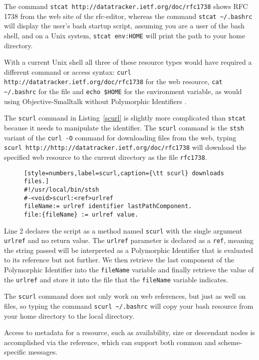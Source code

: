 \documentclass[preprint,authoryear]{llncs}
\begin{document}
The command  {\tt stcat http://datatracker.ietf.org/doc/rfc1738} shows RFC 1738 from the web site of the rfc-editor, whereas 
the command {\tt stcat \~\//.bashrc} will display the user's bash startup script, assuming you are a user of the
bash shell, and on a Unix system, {\tt stcat env:HOME} will print the path to 
your home directory.

With a current Unix shell all three of these resource types would have required a different
command or access syntax:   {\tt curl http://datatracker.ietf.org/doc/rfc1738} for the
web resource, {\tt cat  \~\//.bashrc} for the file and {\tt echo \$HOME} for the environment
variable, as would using Objective-Smalltalk without Polymorphic Identifiers .

The {\tt scurl} command in Listing~\ref{scurl} is slightly more complicated than {\tt stcat} because
it needs to manipulate the identifier.  The {\tt scurl} command
is the {\tt stsh} variant of the {\tt curl -O} command for downloading files from the web, typing
{\tt scurl http://http://datatracker.ietf.org/doc/rfc1738} will download the specified web resource
to the current directory as the file {\tt rfc1738}.

\begin{figure}[htbp]
\begin{lstlisting}[style=numbers,label=scurl,caption={\tt scurl} downloads files.]
#!/usr/local/bin/stsh
#-<void>scurl:<ref>urlref
fileName:= urlref identifier lastPathComponent.
file:{fileName} := urlref value.
\end{lstlisting}
\end{figure}

Line 2 declares
the script as a method named {\tt scurl} with the single argument {\tt urlref} and no return
value.  The {\tt urlref} parameter is declared as a {\tt ref}, meaning the string passed will
be interpreted as a Polymorphic Identifier that is evaluated to its reference but not further.
We then retrieve the last component of the Polymorphic Identifier into the {\tt fileName}
variable and finally retrieve the value of the {\tt urlref} and store it into the file that
the {\tt fileName} variable indicates.

The {\tt scurl} command does not only work on web references, but just as well
on files, so typing the command {\tt scurl \~\//.bashrc} will copy your bash resource from your home directory
to the local directory.

Access to metadata for a resource, such as availability, size or descendant nodes
is accomplished via the reference, which can support both common and scheme-specific
messages.
\end{document}
